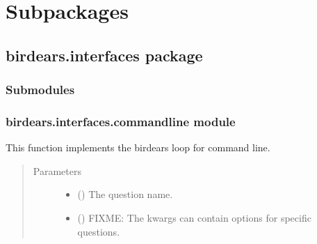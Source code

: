 \documentclass[letterpaper,10pt,english]{sphinxmanual}
\begin{document}
\section{Subpackages}
\label{\detokenize{birdears:subpackages}}

\subsection{birdears.interfaces package}
\label{\detokenize{birdears.interfaces:module-birdears.interfaces}}\label{\detokenize{birdears.interfaces::doc}}\label{\detokenize{birdears.interfaces:birdears-interfaces-package}}

\subsubsection{Submodules}
\label{\detokenize{birdears.interfaces:submodules}}

\subsubsection{birdears.interfaces.commandline module}
\label{\detokenize{birdears.interfaces:birdears-interfaces-commandline-module}}\label{\detokenize{birdears.interfaces:module-birdears.interfaces.commandline}}

\begin{fulllineitems}
\label{\detokenize{birdears.interfaces:birdears.interfaces.commandline.CommandLine}}
This function implements the birdears loop for command line.
\begin{quote}\begin{description}
\item[{Parameters}] \leavevmode\begin{itemize}
\item {} 
 () \textendash{} The question name.

\item {} 
 () \textendash{} FIXME: The kwargs can contain options for specific
questions.

\end{itemize}

\end{description}\end{quote}

\end{fulllineitems}
\end{document}
